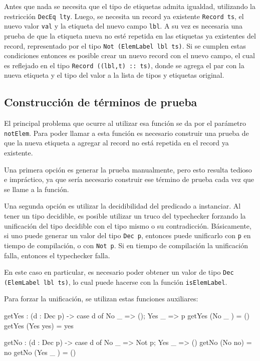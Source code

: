 Antes que nada se necesita que el tipo de etiquetas admita igualdad, utilizando la restricción \texttt{DecEq lty}. Luego, se necesita un record ya existente \texttt{Record ts}, el nuevo valor \texttt{val} y la etiqueta del nuevo campo \texttt{lbl}. A su vez es necesaria una prueba de que la etiqueta nueva no esté repetida en las etiquetas ya existentes del record, representado por el tipo \texttt{Not (ElemLabel lbl ts)}. Si se cumplen estas condiciones entonces es posible crear un nuevo record con el nuevo campo, el cual es reflejado en el tipo \texttt{Record ((lbl,t) :: ts)}, donde se agrega el par con la nueva etiqueta y el tipo del valor a la lista de tipos y etiquetas original.

\subsection{Construcción de términos de prueba}

El principal problema que ocurre al utilizar esa función se da por el parámetro \texttt{notElem}. Para poder llamar a esta función es necesario construir una prueba de que la nueva etiqueta a agregar al record no está repetida en el record ya existente.

Una primera opción es generar la prueba manualmente, pero esto resulta tedioso e impráctico, ya que sería necesario construir ese término de prueba cada vez que se llame a la función.

Una segunda opción es utilizar la decidibilidad del predicado a instanciar. Al tener un tipo decidible, es posible utilizar un truco del typechecker forzando la unificación del tipo decidible con el tipo mismo o su contradicción.
Básicamente, si uno puede generar un valor del tipo \texttt{Dec p}, entonces puede unificarlo con \texttt{p} en tiempo de compilación, o con \texttt{Not p}. Si en tiempo de compilación la unificación falla, entonces el typechecker falla.

En este caso en particular, es necesario poder obtener un valor de tipo \texttt{Dec (ElemLabel lbl ts)}, lo cual puede hacerse con la función \texttt{isElemLabel}.

Para forzar la unificación, se utilizan estas funciones auxiliares:

\begin{code}
getYes : (d : Dec p) -> case d of { No _ => (); Yes _ => p}
getYes (No _ ) = ()
getYes (Yes yes) = yes

getNo : (d : Dec p) -> case d of { No _ => Not p; Yes _ => ()}
getNo (No no) = no
getNo (Yes _ ) = ()
\end{code}

